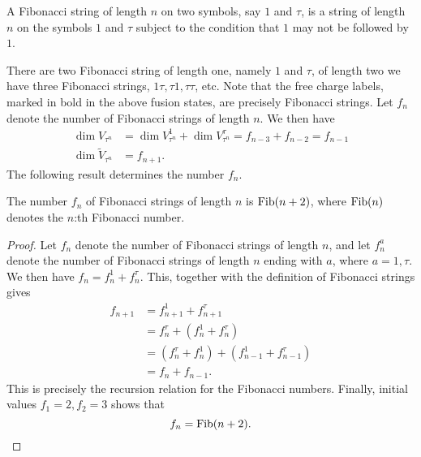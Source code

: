 \begin{definition}\label{def:fibonacci strings}
  A Fibonacci string of length $n$ on two symbols, say $1$ and $τ$, is a string of length $n$ on the symbols $1$ and $τ$ subject to the condition that $1$ may not be followed by $1$.
\end{definition}

There are two Fibonacci string of length one, namely $1$ and $τ$, of length two we have three Fibonacci strings, $1τ, τ1, ττ$, etc. Note that the free charge labels, marked in bold in the above fusion states, are precisely Fibonacci strings. Let $f_n$ denote the number of Fibonacci strings of length $n$. We then have
\begin{equation}
  \begin{aligned}
    \dim V_{τ^n} &= \dim V_{τ^n}^1 + \dim V_{τ^n}^τ = f_{n-3} + f_{n-2} = f_{n-1} \\
    \dim \widetilde{V}_{τ^n} &= f_{n+1}.
  \end{aligned}
\end{equation}
The following result determines the number $f_n$.

\begin{lemma}\label{lemma:fibonacci string length}
  The number $f_n$ of Fibonacci strings of length $n$ is $\operatorname{Fib}(n + 2)$, where $\operatorname{Fib}(n)$ denotes the $n$:th Fibonacci number.
\end{lemma}

\begin{proof}
  Let $f_n$ denote the number of Fibonacci strings of length $n$, and let $f^a_n$ denote the number of Fibonacci strings of length $n$ ending with $a$, where $a = 1, τ$. We then have $f_n = f^1_n + f^τ_n$. This, together with the definition of Fibonacci strings gives
  \begin{equation}
    \begin{aligned}
      f_{n+1}
      &= f^1_{n+1} + f^τ_{n+1} \\
      &= f^τ_n + \left(f^1_n + f^τ_n\right) \\
      &= \left(f^τ_n + f^1_n\right) + \left(f^1_{n-1} + f^τ_{n-1}\right) \\
      &= f_n + f_{n-1}.
    \end{aligned}
  \end{equation}
  This is precisely the recursion relation for the Fibonacci numbers. Finally, initial values $f_1 = 2, f_2 = 3$ shows that
  \begin{equation}
    f_n = \operatorname{Fib}(n+2).
  \end{equation}
\end{proof}

